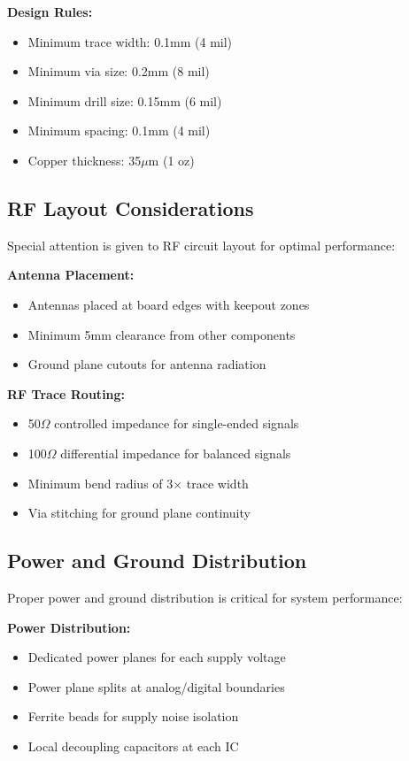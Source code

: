 \textbf{Design Rules:}
\begin{itemize}
\item Minimum trace width: 0.1mm (4 mil)
\item Minimum via size: 0.2mm (8 mil)
\item Minimum drill size: 0.15mm (6 mil)
\item Minimum spacing: 0.1mm (4 mil)
\item Copper thickness: 35$\mu$m (1 oz)
\end{itemize}

\subsection{RF Layout Considerations}
\label{subsec:rf_layout}

Special attention is given to RF circuit layout for optimal performance:

\textbf{Antenna Placement:}
\begin{itemize}
\item Antennas placed at board edges with keepout zones
\item Minimum 5mm clearance from other components
\item Ground plane cutouts for antenna radiation
\end{itemize}

\textbf{RF Trace Routing:}
\begin{itemize}
\item 50$\Omega$ controlled impedance for single-ended signals
\item 100$\Omega$ differential impedance for balanced signals
\item Minimum bend radius of 3× trace width
\item Via stitching for ground plane continuity
\end{itemize}

\subsection{Power and Ground Distribution}
\label{subsec:power_ground}

Proper power and ground distribution is critical for system performance:

\textbf{Power Distribution:}
\begin{itemize}
\item Dedicated power planes for each supply voltage
\item Power plane splits at analog/digital boundaries
\item Ferrite beads for supply noise isolation
\item Local decoupling capacitors at each IC
\end{itemize}

